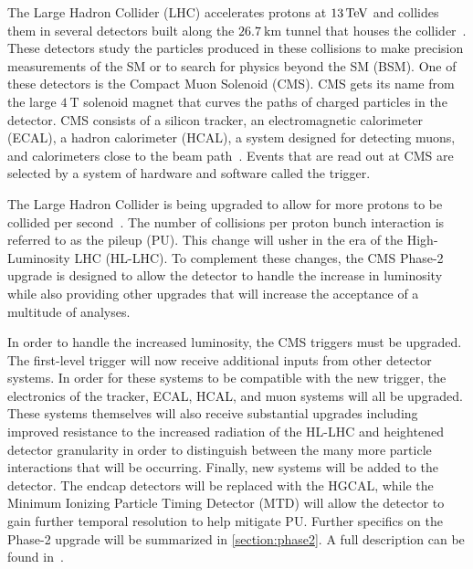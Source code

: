 The Large Hadron Collider (LHC) accelerates protons at $\TeV{13}$ and collides them in several detectors built along the $\SI{26.7}{\km}$ tunnel that houses the collider~\cite{Evans_2008}. These detectors study the particles produced in these collisions to make precision measurements of the SM or to search for physics beyond the SM (BSM). One of these detectors is the Compact Muon Solenoid (CMS). CMS gets its name from the large $\SI{4}{\tesla}$ solenoid magnet that curves the paths of charged particles in the detector. CMS consists of a silicon tracker, an electromagnetic calorimeter (ECAL), a hadron calorimeter (HCAL), a system designed for detecting muons, and calorimeters close to the beam path~\cite{Collaboration_2008}. Events that are read out at CMS are selected by a system of hardware and software called the trigger. 

The Large Hadron Collider is being upgraded to allow for more protons to be collided per second~\cite{Collaboration:2650976}. The number of collisions per proton bunch interaction is referred to as the pileup (PU). This change will usher in the era of the High-Luminosity LHC (HL-LHC). To complement these changes, the CMS Phase-2 upgrade is designed to allow the detector to handle the increase in luminosity while also providing other upgrades that will increase the acceptance of a multitude of analyses. 

In order to handle the increased luminosity, the CMS triggers must be upgraded. The first-level trigger will now receive additional inputs from other detector systems. In order for these systems to be compatible with the new trigger, the electronics of the tracker, ECAL, HCAL, and muon systems will all be upgraded. These systems themselves will also receive substantial upgrades including improved resistance to the increased radiation of the HL-LHC and heightened detector granularity in order to distinguish between the many more particle interactions that will be occurring. Finally, new systems will be added to the detector. The endcap detectors will be replaced with the HGCAL, while the Minimum Ionizing Particle Timing Detector (MTD) will allow the detector to gain further temporal resolution to help mitigate PU.
Further specifics on the Phase-2 upgrade will be summarized in \cref{section:phase2}. A full description can be found in~\cite{Collaboration:2650976, Contardo:2020886, CERN-LHCC-2020-004, CERN-LHCC-2017-011, CERN-LHCC-2017-023, CERN-LHCC-2017-012, CERN-LHCC-2017-009, CMS:2667167, Collaboration:2759072}.

